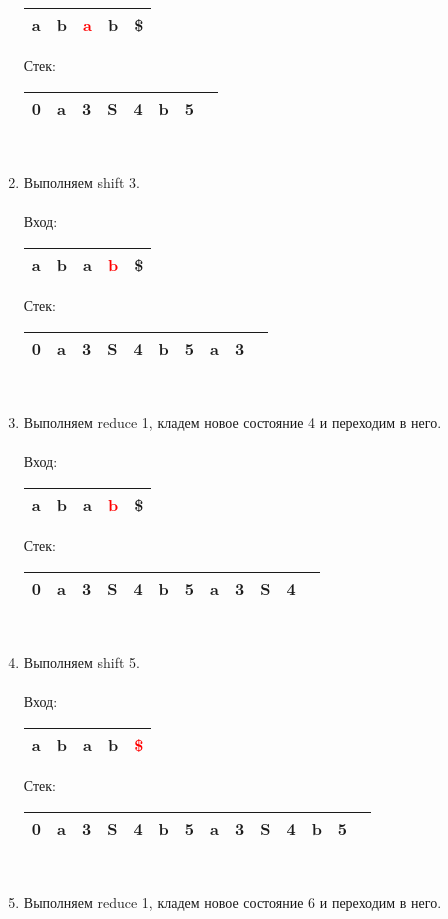 \begin{example}
\begin{enumerate}
\begin{tabular}[c]{ |c|c|c|c|c| }
    \hline a & b & \textcolor{red}{a} & b & \$ \\ \hline
\end{tabular}
\qquad Стек: \,
\begin{tabular}[c]{ |c|c|c|c|c|c|c|c } 
    \hline 0 & a & 3 & S & 4 & b & 5 & \\ \hline
\end{tabular}
\\
\item Выполняем shift 3. \\ \\
Вход: \,
\begin{tabular}[c]{ |c|c|c|c|c| } 
    \hline a & b & a & \textcolor{red}{b} & \$ \\ \hline
\end{tabular}
\qquad Стек: \,
\begin{tabular}[c]{ |c|c|c|c|c|c|c|c|c|c } 
    \hline 0 & a & 3 & S & 4 & b & 5 & a & 3 & \\ \hline
\end{tabular}
\\
\item Выполняем reduce 1, кладем новое состояние 4 и переходим в него. \\ \\
Вход: \,
\begin{tabular}[c]{ |c|c|c|c|c| } 
    \hline a & b & a & \textcolor{red}{b} & \$ \\ \hline
\end{tabular}
\qquad Стек: \,
\begin{tabular}[c]{ |c|c|c|c|c|c|c|c|c|c|c|c } 
    \hline 0 & a & 3 & S & 4 & b & 5 & a & 3 & S & 4 & \\ \hline
\end{tabular}
\\
\item Выполняем shift 5. \\ \\
Вход: \,
\begin{tabular}[c]{ |c|c|c|c|c| } 
    \hline a & b & a & b & \textcolor{red}{\$} \\ \hline
\end{tabular}
\qquad Стек: \,
\begin{tabular}[c]{ |c|c|c|c|c|c|c|c|c|c|c|c|c|c } 
    \hline 0 & a & 3 & S & 4 & b & 5 & a & 3 & S & 4 & b & 5 & \\ \hline
\end{tabular}
\\
\item Выполняем reduce 1, кладем новое состояние 6 и переходим в него. \\ \\

\end{enumerate}
\end{example}
